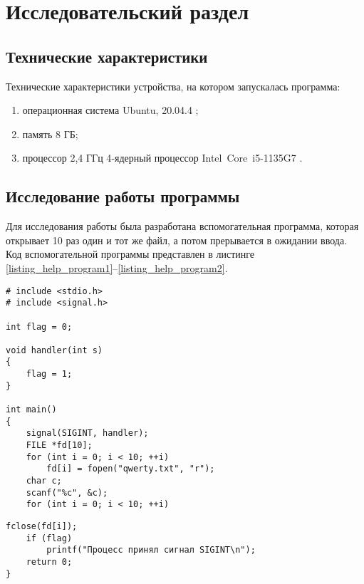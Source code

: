 \chapter{Исследовательский раздел}

\section{Технические характеристики}

Технические характеристики устройства, на котором запускалась программа:

\begin{enumerate}[label=\arabic*.]
	\item операционная система Ubuntu, 20.04.4 \cite{ubuntu};
	\item память 8 ГБ;
	\item процессор 2,4 ГГц 4‑ядерный процессор Intel Core i5-1135G7 \cite{intel}.
\end{enumerate}

\section{Исследование работы программы}

Для исследования работы была разработана вспомогательная программа, которая открывает 10 раз один и тот же файл, а потом прерывается в ожидании ввода. Код вспомогательной программы представлен в листинге \ref{listing_help_program1}--\ref{listing_help_program2}.

\begin{center}
	\begin{lstlisting}[label=listing_help_program1,caption=Вспомогательная программа]
# include <stdio.h>
# include <signal.h>

int flag = 0;

void handler(int s)
{
	flag = 1;
}

int main()
{
	signal(SIGINT, handler);
	FILE *fd[10];
	for (int i = 0; i < 10; ++i)
		fd[i] = fopen("qwerty.txt", "r");
	char c;
	scanf("%c", &c);
	for (int i = 0; i < 10; ++i)
	\end{lstlisting}
\end{center}

\begin{center}
	\begin{lstlisting}[label=listing_help_program2,caption=Вспомогательная программа]
		fclose(fd[i]);
	if (flag)
		printf("Процесс принял сигнал SIGINT\n");
	return 0;
}
	\end{lstlisting}
\end{center}

